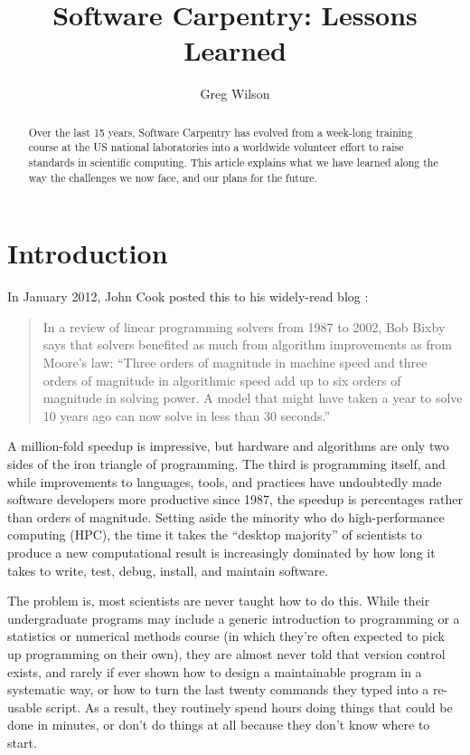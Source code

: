 \documentclass[10pt,a4paper,twocolumn]{article}
\begin{document}
\title{Software Carpentry: Lessons Learned}
\author[1]{Greg Wilson}

\maketitle
\thispagestyle{fancy}

\begin{abstract}

Over the last 15 years, Software Carpentry has evolved from a week-long
training course at the US national laboratories into a worldwide
volunteer effort to raise standards in scientific computing. This
article explains what we have learned along the way the challenges we
now face, and our plans for the future.

\end{abstract}
\clearpage

\section*{Introduction}

In January 2012, John Cook posted this to his widely-read blog
\cite{cook2012}:

\begin{quote}
In a review of linear programming solvers from 1987 to 2002, Bob Bixby
says that solvers benefited as much from algorithm improvements as from
Moore's law: ``Three orders of magnitude in machine speed and three
orders of magnitude in algorithmic speed add up to six orders of
magnitude in solving power. A model that might have taken a year to
solve 10 years ago can now solve in less than 30 seconds.''
\end{quote}

A million-fold speedup is impressive, but hardware and algorithms are
only two sides of the iron triangle of programming. The third is
programming itself, and while improvements to languages, tools, and
practices have undoubtedly made software developers more productive
since 1987, the speedup is percentages rather than orders of magnitude.
Setting aside the minority who do high-performance computing (HPC), the
time it takes the ``desktop majority'' of scientists to produce a new
computational result is increasingly dominated by how long it takes to
write, test, debug, install, and maintain software.

The problem is, most scientists are never taught how to do this. While
their undergraduate programs may include a generic introduction to
programming or a statistics or numerical methods course (in which
they're often expected to pick up programming on their own), they are
almost never told that version control exists, and rarely if ever shown
how to design a maintainable program in a systematic way, or how to turn
the last twenty commands they typed into a re-usable script. As a
result, they routinely spend hours doing things that could be done in
minutes, or don't do things at all because they don't know where to
start.
\end{document}
